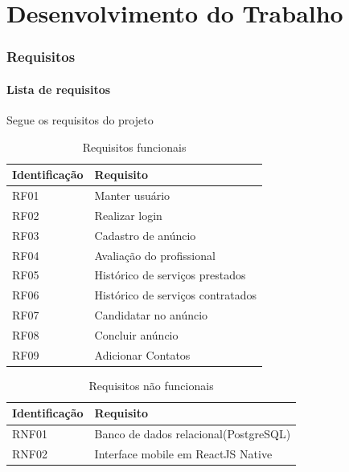 
\chapter{Desenvolvimento do Trabalho}

\subsection{Requisitos}
\subsubsection{Lista de requisitos}
Segue os requisitos do projeto
\begin{table}[htb]
	\centering
	\caption{\label{Formatação do texto.}Requisitos funcionais}
	\begin{tabular}{|l|p{11cm}|}
	\hline
	\textbf{Identificação} & \textbf{Requisito}\\ \hline
	RF01 & Manter usuário \\ \hline
	RF02 & Realizar login \\ \hline
	RF03 & Cadastro de anúncio \\ \hline
	RF04 & Avaliação do profissional\\ \hline
	RF05 & Histórico de serviços prestados \\ \hline
	RF06 & Histórico de serviços contratados \\ \hline
	RF07 & Candidatar no anúncio \\ \hline
	RF08 & Concluir anúncio \\ \hline
	RF09 & Adicionar Contatos \\ \hline
	\end{tabular}
\end{table}

\begin{table}[htb]
	\centering
	\caption{\label{Formatação do texto.}Requisitos não funcionais}
	\begin{tabular}{|l|p{11cm}|}
	\hline
	\textbf{Identificação}    & \textbf{Requisito}\\ \hline
	RNF01        			  & Banco de dados relacional(PostgreSQL)\\ \hline
	RNF02        			  & Interface mobile em ReactJS Native\\ \hline
	\end{tabular}
\end{table}

